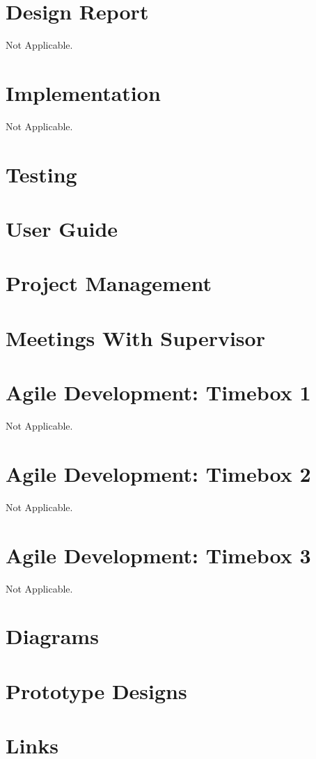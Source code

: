 \documentclass[a4paper,12pt]{report}
\begin{document}
\chapter{Design Report}
Not Applicable.
\chapter{Implementation}
Not Applicable.
\chapter{Testing}

\chapter{User Guide}

\chapter{Project Management}

\chapter{Meetings With Supervisor}

\chapter{Agile Development: Timebox 1}
Not Applicable.
\chapter{Agile Development: Timebox 2}
Not Applicable.
\chapter{Agile Development: Timebox 3}
Not Applicable.
\chapter{Diagrams}

\chapter{Prototype Designs}

\chapter{Links}


\glsaddallunused
\end{document}

